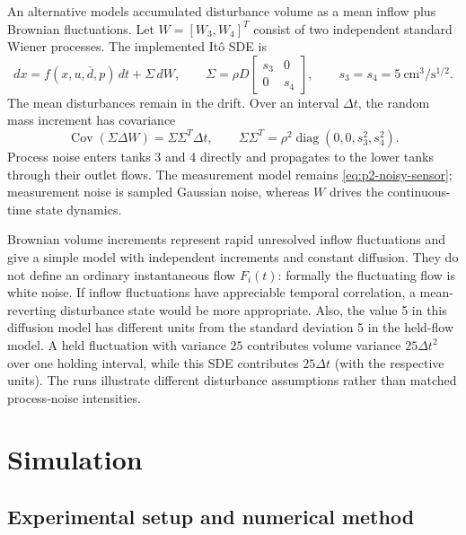 An alternative models accumulated disturbance volume as a mean inflow
plus Brownian fluctuations. Let $W=[W_3,W_4]^T$ consist of two independent
standard Wiener processes. The implemented It\^o SDE is
\begin{equation}
 dx=f(x,u,\bar d,p)\,dt+\Sigma\,dW,\qquad
 \Sigma=\rho D\begin{bmatrix}s_3&0\\0&s_4\end{bmatrix},\qquad
 s_3=s_4=5\ \mathrm{cm^3/s^{1/2}}.
 \label{eq:p2-sde}
\end{equation}
The mean disturbances remain in the drift. Over an interval $\Delta t$,
the random mass increment has covariance
\begin{equation}
 \operatorname{Cov}(\Sigma\Delta W)=\Sigma\Sigma^T\Delta t,\qquad
 \Sigma\Sigma^T=\rho^2\operatorname{diag}(0,0,s_3^2,s_4^2).
\end{equation}
Process noise enters tanks 3 and 4 directly and propagates to the lower
tanks through their outlet flows. The measurement model remains
\eqref{eq:p2-noisy-sensor}; measurement noise is sampled Gaussian noise,
whereas $W$ drives the continuous-time state dynamics.

Brownian volume increments represent rapid unresolved inflow fluctuations
and give a simple model with independent increments and constant diffusion.
They do not define an ordinary instantaneous flow $F_i(t)$: formally the
fluctuating flow is white noise. If inflow fluctuations have appreciable
temporal correlation, a mean-reverting disturbance state would be more
appropriate. Also, the value 5 in this diffusion model has different units
from the standard deviation 5 in the held-flow model. A held fluctuation
with variance $25$ contributes volume variance $25\Delta t^2$ over one
holding interval, while this SDE contributes $25\Delta t$ (with the
respective units). The runs illustrate different disturbance assumptions
rather than matched process-noise intensities.

\section{Simulation}

\subsection{Experimental setup and numerical method}

